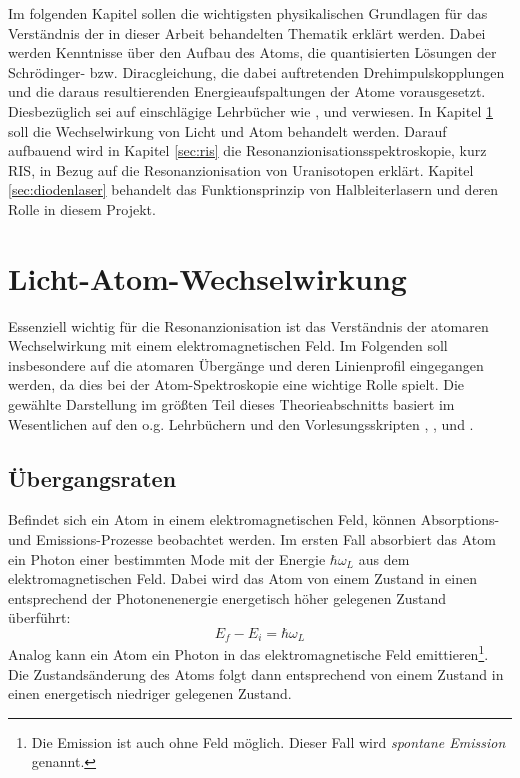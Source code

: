 Im folgenden Kapitel sollen die wichtigsten physikalischen Grundlagen für das
Verständnis der in dieser Arbeit behandelten Thematik erklärt werden. Dabei
werden Kenntnisse über den Aufbau des Atoms, die quantisierten Lösungen der
Schrödinger- bzw. Diracgleichung, die dabei auftretenden Drehimpulskopplungen
und die daraus resultierenden Energieaufspaltungen der Atome vorausgesetzt.
Diesbezüglich sei auf einschlägige Lehrbücher wie
\cite{demtroeder:ex3}, \cite{demtroeder:laserspektroskopie} und \cite{saleh:grundlagen_der_photonik}
verwiesen. In Kapitel \ref{sec:licht-atom-wechselwirkung} soll die
Wechselwirkung von Licht und Atom behandelt werden. Darauf aufbauend wird
in Kapitel \ref{sec:ris} die Resonanzionisationsspektroskopie,
kurz RIS, in Bezug auf die Resonanzionisation von Uranisotopen erklärt. Kapitel
\ref{sec:diodenlaser} behandelt das Funktionsprinzip von Halbleiterlasern und
deren Rolle in diesem Projekt.

\section{Licht-Atom-Wechselwirkung}\label{sec:licht-atom-wechselwirkung}
Essenziell wichtig für die Resonanzionisation ist das Verständnis der atomaren
Wechselwirkung mit einem elektromagnetischen Feld. Im Folgenden soll insbesondere auf die
atomaren Übergänge und deren Linienprofil eingegangen werden, da dies bei der
Atom-Spektroskopie eine wichtige Rolle spielt. Die gewählte Darstellung im
größten Teil dieses Theorieabschnitts basiert im Wesentlichen auf den o.g.
Lehrbüchern und den Vorlesungsskripten \cite{bloch:atomphysik},
\cite{rauschenbeutel:atomphysik}, \cite{rauschenbeutel:quantenoptik} und
\cite{kuhr:quantenoptik}.

\subsection{Übergangsraten}\label{subsec:uebergangsraten}
Befindet sich ein Atom in einem elektromagnetischen Feld, können Absorptions-
und Emissions-Prozesse beobachtet werden. Im ersten Fall absorbiert das Atom ein
Photon einer bestimmten Mode mit der Energie $\hbar\omega_L$ aus dem elektromagnetischen Feld.
Dabei wird das Atom von einem Zustand in einen entsprechend der Photonenenergie
energetisch höher gelegenen Zustand überführt:
\begin{equation}\label{eq:uebergang}
	E_f-E_i=\hbar\omega_L
\end{equation}
Analog kann ein Atom ein
Photon in das elektromagnetische Feld emittieren\footnote{Die Emission ist
auch ohne Feld möglich. Dieser Fall wird \textit{spontane Emission} genannt.}.
Die Zustandsänderung des Atoms folgt dann entsprechend von einem Zustand in
einen energetisch niedriger gelegenen Zustand.\par

